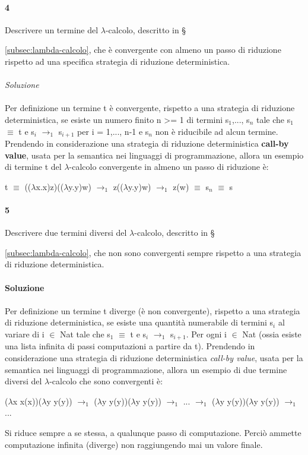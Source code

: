 \paragraph{4}
Descrivere un termine del $\lambda$-calcolo, descritto in \S{\ref{subsec:lambda-calcolo},  che \`e convergente con almeno un passo di riduzione rispetto ad una specifica strategia di riduzione deterministica.\\\\
\textit{Soluzione}\\\\
Per definizione un termine t \`e convergente, rispetto a una strategia di
riduzione deterministica, se esiste un numero finito n >= 1 di termini s$_1$,..., s$_n$ tale che s$_1$ $\equiv$ t e s$_i$ $\rightarrow_1$ s$_{i + 1}$ per i = 1,..., n-1 e s$_n$ non \`e riducibile ad alcun termine.\\
Prendendo in considerazione una strategia di riduzione deterministica \textbf{call-by value}, usata per la semantica nei linguaggi di programmazione, allora un esempio di termine t del $\lambda$-calcolo convergente in almeno un passo di riduzione \`e:
\begin{center}t $\equiv$ (($\lambda$x.x)z)(($\lambda$y.y)w) $\rightarrow_1$ z(($\lambda$y.y)w) $\rightarrow_1$ z(w) $\equiv$ s$_n$ $\equiv$ s\end{center}
\paragraph{5} 
Descrivere due termini diversi del $\lambda$-calcolo, descritto in \S{\ref{subsec:lambda-calcolo}, che non sono convergenti sempre rispetto a una strategia di riduzione deterministica.\\\\
\textbf{Soluzione}\\\\
Per definizione un termine t diverge (\`e non convergente), rispetto a una strategia
di riduzione deterministica, se esiste una quantit\`a numerabile di termini s$_i$ al variare di i $\in$ Nat tale che s$_1$ $\equiv$ t e s$_i$ $\rightarrow_1$ s$_{i+1}$. Per ogni i $\in$ Nat (ossia esiste una lista infinita di passi computazioni a partire da t).
Prendendo in considerazione una strategia di riduzione deterministica \textit{call-by value}, usata per la semantica nei linguaggi di programmazione, allora un esempio di due termine diversi del $\lambda$-calcolo che sono convergenti \`e:
\begin{center}($\lambda$x x(x))($\lambda$y y(y)) $\rightarrow_1$ ($\lambda$y y(y))($\lambda$y y(y))  $\rightarrow_1$ ... $\rightarrow_1$ ($\lambda$y y(y))($\lambda$y y(y)) $\rightarrow_1$ ... \end{center}
Si riduce sempre a se stessa, a qualunque passo di computazione. Perci\`o ammette computazione infinita (diverge) non raggiungendo mai un valore finale.
}}
